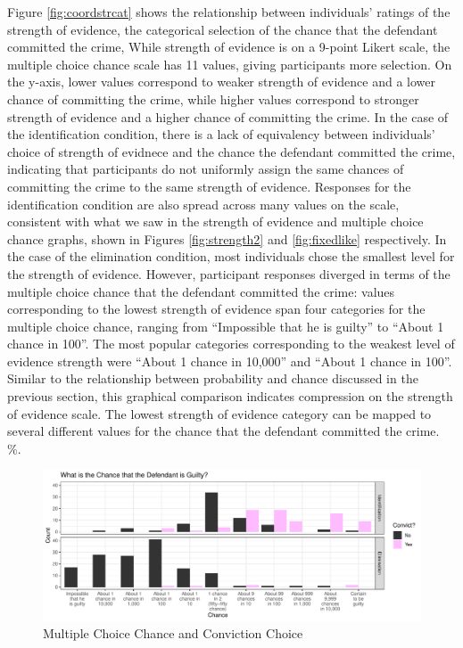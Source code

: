 \documentclass[print]{nuthesis}
\begin{document}
Figure \ref{fig:coordstrcat} shows the relationship between individuals' ratings of the strength of evidence, the categorical selection of the chance that the defendant committed the crime, 
While strength of evidence is on a 9-point Likert scale, the multiple choice chance scale has 11 values, giving participants more selection.
On the y-axis, lower values correspond to weaker strength of evidence and a lower chance of committing the crime, while higher values correspond to stronger strength of evidence and a higher chance of committing the crime.
In the case of the identification condition, there is a lack of equivalency between individuals' choice of strength of evidnece and the chance the defendant committed the crime, indicating that participants do not uniformly assign the same chances of committing the crime to the same strength of evidence.
Responses for the identification condition are also spread across many values on the scale, consistent with what we saw in the strength of evidence and multiple choice chance graphs, shown in Figures \ref{fig:strength2} and \ref{fig:fixedlike} respectively.
In the case of the elimination condition, most individuals chose the smallest level for the strength of evidence.
However, participant responses diverged in terms of the multiple choice chance that the defendant committed the crime: values corresponding to the lowest strength of evidence span four categories for the multiple choice chance, ranging from ``Impossible that he is guilty'' to ``About 1 chance in 100''.
The most popular categories corresponding to the weakest level of evidence strength were ``About 1 chance in 10,000'' and ``About 1 chance in 100''.
Similar to the relationship between probability and chance discussed in the previous section, this graphical comparison indicates compression on the strength of evidence scale.
The lowest strength of evidence category can be mapped to several different values for the chance that the defendant committed the crime.
\%.

\begin{figure}

{\centering \includegraphics[width=\linewidth]{thesis_files/figure-latex/convictlike-1} 

}

\caption{Multiple Choice Chance and Conviction Choice}\label{fig:convictlike}
\end{figure}
\end{document}
